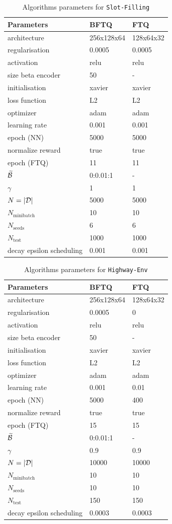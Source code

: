 \begin{table}[tp]
    \centering
    \begin{tabularx}{1.0\textwidth}{lll}
        \toprule
        Parameters & BFTQ & FTQ\tabularnewline
        \midrule
        architecture & 256x128x64 & 128x64x32\tabularnewline
        regularisation & 0.0005 & 0.0005\tabularnewline
        activation & relu & relu\tabularnewline
        size beta encoder & 50 & -\tabularnewline
        initialisation & xavier & xavier\tabularnewline
        loss function & L2 & L2\tabularnewline
        optimizer & adam & adam\tabularnewline
        learning rate & 0.001 & 0.001\tabularnewline
        epoch (NN) & 5000 & 5000\tabularnewline
        normalize reward & true & true\tabularnewline
        epoch (FTQ) & 11 & 11\tabularnewline
        $\widetilde{\mathcal{B}}$ & 0:0.01:1 & -\tabularnewline
        $\gamma$ & 1 & 1\tabularnewline
        $N=|\mathcal{D}|$ & 5000 & 5000\tabularnewline
        $N_\text{minibatch}$ & 10 & 10\tabularnewline
        $N_\text{seeds}$ & 6 & 6\tabularnewline
        $N_\text{test}$ & 1000 & 1000\tabularnewline
        decay epsilon scheduling & 0.001 & 0.001\tabularnewline
        \bottomrule
    \end{tabularx}
    \caption{Algorithms parameters for \texttt{Slot-Filling}}
    \label{tab:param-algo-slot-filling}
\end{table}
\begin{table}[tp]
    \centering
    \begin{tabularx}{1.0\textwidth}{lll}
        \toprule
        Parameters & BFTQ & FTQ\tabularnewline
        \midrule
        architecture & 256x128x64 & 128x64x32\tabularnewline
        regularisation & 0.0005 & 0\tabularnewline
        activation & relu & relu\tabularnewline
        size beta encoder & 50 & -\tabularnewline
        initialisation & xavier & xavier\tabularnewline
        loss function & L2 & L2\tabularnewline
        optimizer & adam & adam\tabularnewline
        learning rate & 0.001 & 0.01\tabularnewline
        epoch (NN) & 5000 & 400\tabularnewline
        normalize reward & true & true\tabularnewline
        epoch (FTQ) & 15 & 15\tabularnewline
        $\widetilde{\mathcal{B}}$ & 0:0.01:1 & -\tabularnewline
        $\gamma$ & 0.9 & 0.9\tabularnewline
        $N=|\mathcal{D}|$ & 10000 & 10000\tabularnewline
        $N_\text{minibatch}$ & 10 & 10\tabularnewline
        $N_\text{seeds}$ & 10 & 10\tabularnewline
        $N_\text{test}$ & 150 & 150\tabularnewline
        decay epsilon scheduling & 0.0003 & 0.0003\tabularnewline
        \bottomrule
    \end{tabularx}
    \caption{Algorithms parameters for \texttt{Highway-Env}}
    \label{tab:param-algo-highway-env}
\end{table}

